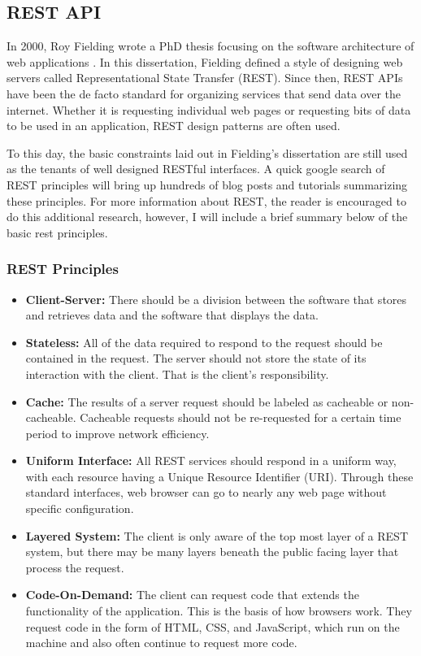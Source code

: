 \subsection{REST API}
In 2000, Roy Fielding wrote a PhD thesis focusing on the software architecture of web applications \cite{fieldingArchitecturalStylesDesign2000}.  In this dissertation, Fielding defined a style of designing web servers called Representational State Transfer (REST).  Since then, REST APIs have been the de facto standard for organizing services that send data over the internet.  Whether it is requesting individual web pages or requesting bits of data to be used in an application, REST design patterns are often used. 

To this day, the basic constraints laid out in Fielding's dissertation are still used as the tenants of well designed RESTful interfaces.  A quick google search of REST principles will bring up hundreds of blog posts and tutorials summarizing these principles. For more information about REST, the reader is encouraged to do this additional research, however, I will include a brief summary below of the basic rest principles.

\subsubsection{REST Principles}

\begin{itemize}
    \item \textbf{Client-Server:} There should be a division between the software that stores and retrieves data and the software that displays the data.
    \item \textbf{Stateless:} All of the data required to respond to the request should be contained in the request. The server should not store the state of its interaction with the client. That is the client's responsibility.
    \item \textbf{Cache:} The results of a server request should be labeled as cacheable or non-cacheable.  Cacheable requests should not be re-requested for a certain time period to improve network efficiency.
    \item \textbf{Uniform Interface:} All REST services should respond in a uniform way, with each resource having a Unique Resource Identifier (URI).  Through these standard interfaces, web browser can go to nearly any web page without specific configuration.
    \item \textbf{Layered System:} The client is only aware of the top most layer of a REST system, but there may be many layers beneath the public facing layer that process the request.
    \item \textbf{Code-On-Demand:} The client can request code that extends the functionality of the application.  This is the basis of how browsers work.  They request code in the form of HTML, CSS, and JavaScript, which run on the machine and also often continue to request more code.
\end{itemize}

